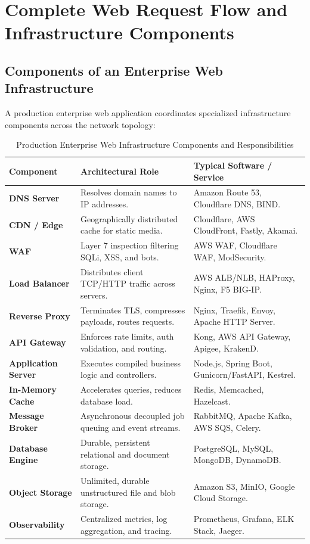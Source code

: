 \section{Complete Web Request Flow and Infrastructure Components}
\label{sec:se_production_infrastructure}

\subsection{Components of an Enterprise Web Infrastructure}
A production enterprise web application coordinates specialized infrastructure components across the network topology:
\begin{table}[htbp]
\centering
\small
\caption{Production Enterprise Web Infrastructure Components and Responsibilities}
\label{tab:web_infrastructure_components}
\begin{tabularx}{\textwidth}{l p{4.2cm} X}
\toprule
\textbf{Component} & \textbf{Architectural Role} & \textbf{Typical Software / Service} \\
\midrule
\textbf{DNS Server} & Resolves domain names to IP addresses. & Amazon Route 53, Cloudflare DNS, BIND. \\
\textbf{CDN / Edge} & Geographically distributed cache for static media. & Cloudflare, AWS CloudFront, Fastly, Akamai. \\
\textbf{WAF} & Layer 7 inspection filtering SQLi, XSS, and bots. & AWS WAF, Cloudflare WAF, ModSecurity. \\
\textbf{Load Balancer} & Distributes client TCP/HTTP traffic across servers. & AWS ALB/NLB, HAProxy, Nginx, F5 BIG-IP. \\
\textbf{Reverse Proxy} & Terminates TLS, compresses payloads, routes requests. & Nginx, Traefik, Envoy, Apache HTTP Server. \\
\textbf{API Gateway} & Enforces rate limits, auth validation, and routing. & Kong, AWS API Gateway, Apigee, KrakenD. \\
\textbf{Application Server} & Executes compiled business logic and controllers. & Node.js, Spring Boot, Gunicorn/FastAPI, Kestrel. \\
\textbf{In-Memory Cache} & Accelerates queries, reduces database load. & Redis, Memcached, Hazelcast. \\
\textbf{Message Broker} & Asynchronous decoupled job queuing and event streams. & RabbitMQ, Apache Kafka, AWS SQS, Celery. \\
\textbf{Database Engine} & Durable, persistent relational and document storage. & PostgreSQL, MySQL, MongoDB, DynamoDB. \\
\textbf{Object Storage} & Unlimited, durable unstructured file and blob storage. & Amazon S3, MinIO, Google Cloud Storage. \\
\textbf{Observability} & Centralized metrics, log aggregation, and tracing. & Prometheus, Grafana, ELK Stack, Jaeger. \\
\bottomrule
\end{tabularx}
\end{table}

